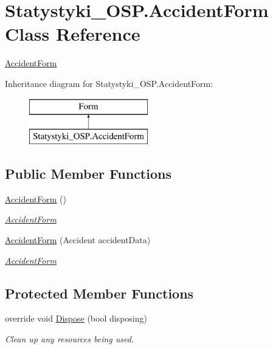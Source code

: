 \hypertarget{class_statystyki___o_s_p_1_1_accident_form}{}\section{Statystyki\+\_\+\+O\+S\+P.\+Accident\+Form Class Reference}
\label{class_statystyki___o_s_p_1_1_accident_form}


\mbox{\hyperlink{class_statystyki___o_s_p_1_1_accident_form}{Accident\+Form}}  


Inheritance diagram for Statystyki\+\_\+\+O\+S\+P.\+Accident\+Form\+:\begin{figure}[H]
\begin{center}
\leavevmode
\includegraphics[height=2.000000cm]{class_statystyki___o_s_p_1_1_accident_form}
\end{center}
\end{figure}
\subsection*{Public Member Functions}
\begin{DoxyCompactItemize}
\item 
\mbox{\hyperlink{class_statystyki___o_s_p_1_1_accident_form_a1d88380db8b7bdadee7138133076a4f1}{Accident\+Form}} ()
\begin{DoxyCompactList}\small\item\em \mbox{\hyperlink{class_statystyki___o_s_p_1_1_accident_form}{Accident\+Form}} \end{DoxyCompactList}\item 
\mbox{\hyperlink{class_statystyki___o_s_p_1_1_accident_form_a153ee0674c96f0736f2931c7030c9156}{Accident\+Form}} (Accident accident\+Data)
\begin{DoxyCompactList}\small\item\em \mbox{\hyperlink{class_statystyki___o_s_p_1_1_accident_form}{Accident\+Form}} \end{DoxyCompactList}\end{DoxyCompactItemize}
\subsection*{Protected Member Functions}
\begin{DoxyCompactItemize}
\item 
override void \mbox{\hyperlink{class_statystyki___o_s_p_1_1_accident_form_a36cf7a790ab5bad9c14734476e9fd8ed}{Dispose}} (bool disposing)
\begin{DoxyCompactList}\small\item\em Clean up any resources being used. \end{DoxyCompactList}\end{DoxyCompactItemize}
